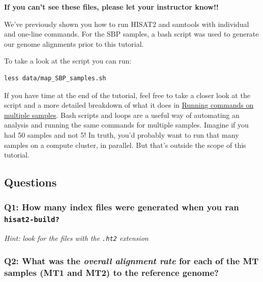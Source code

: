 \documentclass[11pt]{article}
\begin{document}
\textbf{If you can't see these files, please let your instructor know!!}

We've previously shown you how to run HISAT2 and samtools with
individual and one-line commands. For the SBP samples, a bash script was
used to generate our genome alignments prior to this tutorial.

To take a look at the script you can run:

\begin{verbatim}
less data/map_SBP_samples.sh
\end{verbatim}

If you have time at the end of the tutorial, feel free to take a closer
look at the script and a more detailed breakdown of what it does in
\href{running-commands-on-multiple-samples.ipynb}{Running commands on
multiple samples}. Bash scripts and loops are a useful way of automating
an analysis and running the same commands for multiple samples. Imagine
if you had 50 samples and not 5! In truth, you'd probably want to run
that many samples on a compute cluster, in parallel. But that's outside
the scope of this tutorial.

\newpage

    \hypertarget{questions}{%
\subsection{Questions}\label{questions}}

    \hypertarget{q1-how-many-index-files-were-generated-when-you-ran-hisat2-build}{%
\subsubsection{\texorpdfstring{Q1: How many index files were generated
when you ran
\texttt{hisat2-build?}}{Q1: How many index files were generated when you ran hisat2-build?}}\label{q1-how-many-index-files-were-generated-when-you-ran-hisat2-build}}

\textit{Hint: look for the files with the \texttt{.ht2} extension}

\hypertarget{q2-what-was-the-overall-alignment-rate-for-each-of-the-mt-samples-mt1-and-mt2-to-the-reference-genome}{%
\subsubsection{\texorpdfstring{Q2: What was the \textit{overall alignment
rate} for each of the MT samples (MT1 and MT2) to the reference
genome?}{Q2: What was the overall alignment rate for each of the MT samples (MT1 and MT2) to the reference genome?}}\label{q2-what-was-the-overall-alignment-rate-for-each-of-the-mt-samples-mt1-and-mt2-to-the-reference-genome}}
\end{document}
